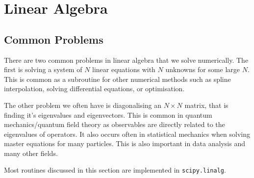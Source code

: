 \documentclass[a4paper]{article}
\begin{document}
    \section{Linear Algebra}
    \subsection{Common Problems}
    There are two common problems in linear algebra that we solve numerically.
    The first is solving a system of \(N\) linear equations with \(N\) unknowns for some large \(N\).
    This is common as a subroutine for other numerical methods such as spline interpolation, solving differential equations, or optimisation.
    
    The other problem we often have is diagonalising an \(N\times N\) matrix, that is finding it's eigenvalues and eigenvectors.
    This is common in quantum mechanics/quantum field theory as observables are directly related to the eigenvalues of operators.
    It also occurs often in statistical mechanics when solving master equations for many particles.
    This is also important in data analysis and many other fields.
    
    Most routines discussed in this section are implemented in \lstinline|scipy.linalg|.
    
\end{document}
